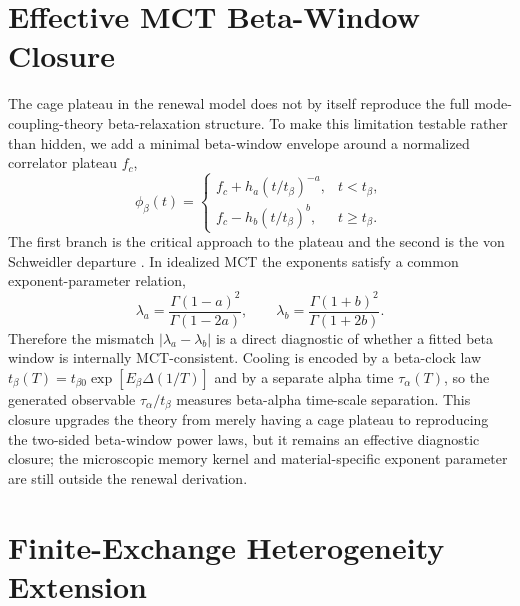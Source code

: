 \documentclass[aps,preprint,onecolumn,superscriptaddress,nofootinbib]{revtex4-2}
\begin{document}
\section{Effective MCT Beta-Window Closure}

The cage plateau in the renewal model does not by itself reproduce the full
mode-coupling-theory beta-relaxation structure. To make this limitation
testable rather than hidden, we add a minimal beta-window envelope around a
normalized correlator plateau $f_c$,
\begin{equation}
  \phi_\beta(t)=
  \begin{cases}
    f_c+h_a(t/t_\beta)^{-a}, & t<t_\beta,\\
    f_c-h_b(t/t_\beta)^b, & t\ge t_\beta.
  \end{cases}
\end{equation}
The first branch is the critical approach to the plateau and the second is the
von Schweidler departure \cite{gotze1992relaxation,kob1995intermediate}. In
idealized MCT the exponents satisfy a common exponent-parameter relation,
\begin{equation}
  \lambda_a=\frac{\Gamma(1-a)^2}{\Gamma(1-2a)},\qquad
  \lambda_b=\frac{\Gamma(1+b)^2}{\Gamma(1+2b)}.
\end{equation}
Therefore the mismatch $|\lambda_a-\lambda_b|$ is a direct diagnostic of
whether a fitted beta window is internally MCT-consistent. Cooling is encoded by
a beta-clock law $t_\beta(T)=t_{\beta0}\exp[E_\beta\Delta(1/T)]$ and by a
separate alpha time $\tau_\alpha(T)$, so the generated observable
$\tau_\alpha/t_\beta$ measures beta-alpha time-scale separation. This closure
upgrades the theory from merely having a cage plateau to reproducing the
two-sided beta-window power laws, but it remains an effective diagnostic
closure; the microscopic memory kernel and material-specific exponent parameter
are still outside the renewal derivation.

\section{Finite-Exchange Heterogeneity Extension}
\end{document}
